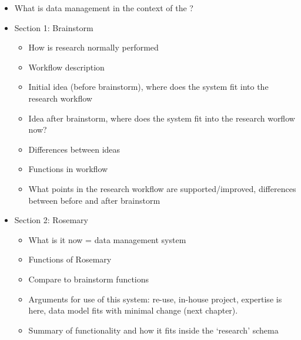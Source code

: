 \begin{itemize}
	\item What is data management in the context of the \ivfsystem{}?	
	\item Section 1: Brainstorm
	\begin{itemize}
		\item How is research normally performed
		\item Workflow description
		\item Initial idea (before brainstorm), where does the system fit into the research workflow
		\item Idea after brainstorm, where does the system fit into the research worflow now?
		\item Differences between ideas
		\item Functions in workflow
		\item What points in the research workflow are supported/improved, differences between before and after brainstorm
	\end{itemize}
	\item Section 2: Rosemary
	\begin{itemize}
		\item What is it now = data management system
		\item Functions of Rosemary
		\item Compare to brainstorm functions
		\item Arguments for use of this system: re-use, in-house project, expertise is here, data model fits with minimal change (next chapter).
		\item Summary of functionality and how it fits inside the `research' schema
	\end{itemize}
\end{itemize}